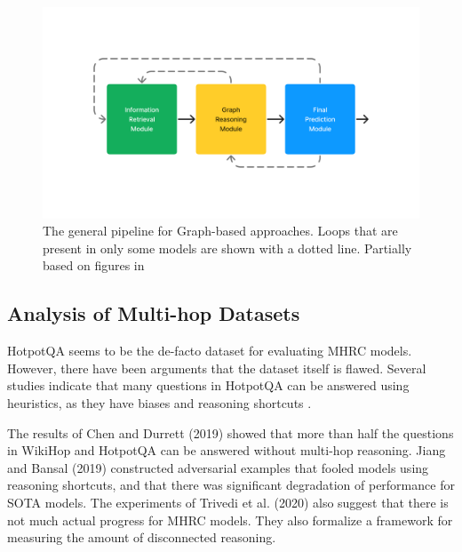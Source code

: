 \documentclass[sigplan,screen,nonacm]{acmart}
\begin{document}
\begin{figure}[t] %
  \centering
  \includegraphics[width=\linewidth]{fig/fig_general_pipeline.pdf} %
  \caption{The general pipeline for Graph-based approaches. Loops that are present in only some models are shown with a dotted line. Partially based on figures in \cite{RN165}}
  \label{fig:general_pipeline} %
\end{figure}

\subsection{Analysis of Multi-hop Datasets}

HotpotQA seems to be the de-facto dataset for evaluating MHRC models. However, there have been arguments that the dataset itself is flawed. 
Several studies \cite{RN176, RN175, RN154, RN150} indicate that many questions in HotpotQA can be answered using heuristics, 
as they have biases and reasoning shortcuts \cite{RN177}.

The results of Chen and Durrett (2019) \cite{RN154} showed that more than half the questions in WikiHop and HotpotQA can be answered without
multi-hop reasoning. Jiang and Bansal (2019) \cite{RN176} constructed adversarial examples that fooled models using reasoning shortcuts, and that
there was significant degradation of performance for SOTA models. The experiments of Trivedi et al. (2020) \cite{RN175} also suggest that there is not
much actual progress for MHRC models. They also formalize a framework for measuring the amount of disconnected reasoning.
\end{document}
